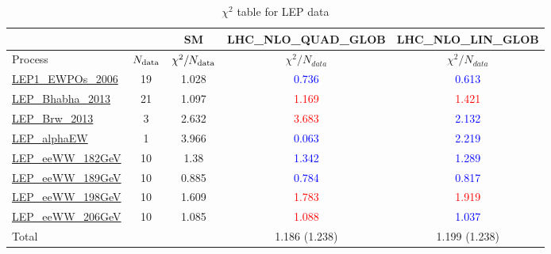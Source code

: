 \documentclass{article}
\begin{document}
\begin{table}[H]
\centering
\begin{tabular}{|l|c|c|c|c|}
\hline
 \multicolumn{2}{|c|}{} & SM& LHC_NLO_QUAD_GLOB& LHC_NLO_LIN_GLOB\\ \hline
Process & $N_{\rm data}$ & $\chi^ 2/N_{\rm data}$& $\chi^ 2/N_{data}$& $\chi^ 2/N_{data}$\\ \hline
\href{https://arxiv.org}{LEP1_EWPOs_2006} & 19 & 1.028 & \textcolor{blue}                            {0.736} & \textcolor{blue}                            {0.613} \\ \hline
\href{https://arxiv.org}{LEP_Bhabha_2013} & 21 & 1.097 & \textcolor{red}                            {1.169} & \textcolor{red}                            {1.421} \\ \hline
\href{https://arxiv.org}{LEP_Brw_2013} & 3 & 2.632 & \textcolor{red}                            {3.683} & \textcolor{blue}                            {2.132} \\ \hline
\href{https://arxiv.org}{LEP_alphaEW} & 1 & 3.966 & \textcolor{blue}                            {0.063} & \textcolor{blue}                            {2.219} \\ \hline
\href{https://arxiv.org}{LEP_eeWW_182GeV} & 10 & 1.38 & \textcolor{blue}                            {1.342} & \textcolor{blue}                            {1.289} \\ \hline
\href{https://arxiv.org}{LEP_eeWW_189GeV} & 10 & 0.885 & \textcolor{blue}                            {0.784} & \textcolor{blue}                            {0.817} \\ \hline
\href{https://arxiv.org}{LEP_eeWW_198GeV} & 10 & 1.609 & \textcolor{red}                            {1.783} & \textcolor{red}                            {1.919} \\ \hline
\href{https://arxiv.org}{LEP_eeWW_206GeV} & 10 & 1.085 & \textcolor{red}                            {1.088} & \textcolor{blue}                            {1.037} \\ \hline
\hline Total & &  & 1.186 (1.238) & 1.199 (1.238) \\ \hline
\end{tabular}
\caption{$\chi^2$ table for LEP data}
\end{table}
\end{document}
